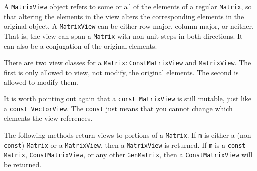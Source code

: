 \documentclass[twoside,letterpaper,11pt]{article}
\renewcommand{\tt}[1]{{\texttt {#1}}}
\begin{document}
A \tt{MatrixView} object refers to some or all of the elements of a regular \tt{Matrix},
so that altering the elements in the view alters the
corresponding elements in the original object.  A \tt{MatrixView}
can be either row-major, column-major, or neither.  That is, the view can 
span a \tt{Matrix} with non-unit steps in both directions.
It can also be a conjugation of the original
elements.

There are two view classes for
a \tt{Matrix}:
\tt{ConstMatrixView} and \tt{MatrixView}.  
The first is only allowed to view,
not modify, the original elements.  The second is allowed to modify them.

It is worth pointing out again that a 
\tt{const MatrixView} is still mutable, just like a \tt{const VectorView}.
The \tt{const} just means that you cannot change which elements
the view references.

The following methods return views to portions of a \tt{Matrix}.
If \tt{m} is either a (non-\tt{const}) \tt{Matrix}
or a \tt{MatrixView}, then a \tt{MatrixView} is returned.
If \tt{m} is a \tt{const Matrix}, \tt{ConstMatrixView}, or any other \tt{GenMatrix},
then a \tt{ConstMatrixView} will be returned. 
\end{document}
